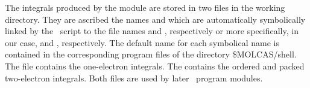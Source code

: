 The integrals produced by the  module are stored in
two files in the working directory.  They are ascribed the 
names  and  which are 
automatically symbolically linked by the \molcas\ script to the file
names  and 
, respectively
or more specifically, in our case,  and
, respectively. The default name for each
symbolical name is contained in the corresponding program files of the
directory {\$MOLCAS/shell}.  
The  file contains the one-electron integrals.
The  contains the ordered and packed two-electron integrals.
Both files are used by later \molcas\ program modules.

%

